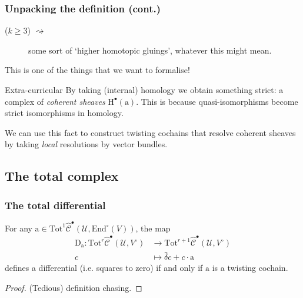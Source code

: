 \documentclass{beamer}
\begin{document}
        \begin{frame}\frametitle{Unpacking the definition (cont.)}
            \begin{description}
                \item[($k\geqslant3$) $\rightsquigarrow$] some sort of `higher homotopic gluings', whatever this might mean.
            \end{description}

            \pause

            This is one of the things that we want to formalise!

            \pause

            \begin{block}{Extra-curricular}
                By taking (internal) homology we obtain something strict: a complex of \emph{coherent sheaves} $\mathrm{H}^\bullet(\mathrm{a})$.
                This is because quasi-isomorphisms become strict isomorphisms in homology.

                We can use this fact to construct twisting cochains that resolve coherent sheaves by taking \emph{local} resolutions by vector bundles.
            \end{block}
        \end{frame}

    \subsection{The total complex}

        \begin{frame}\frametitle{The total differential}
            \begin{lemma}
                For any $\mathrm{a}\in\mathrm{Tot}^1\hat{\mathscr{C}}^\bullet(\mathcal{U},\mathrm{End}^\circ(V))$, the map
                \begin{align*}
                    \mathrm{D}_\mathrm{a} \colon \mathrm{Tot}^r\hat{\mathscr{C}}^\bullet(\mathcal{U},V^\circ) &\to \mathrm{Tot}^{r+1}\hat{\mathscr{C}}^\bullet(\mathcal{U},V^\circ)\\
                    c &\mapsto \hat{\delta}c+c\cdot\mathrm{a}
                \end{align*}
                defines a differential (i.e. squares to zero) if and only if $\mathrm{a}$ is a twisting cochain.
            \end{lemma}
            \begin{proof}
                (Tedious) definition chasing.
            \end{proof}
        \end{frame}
\end{document}
